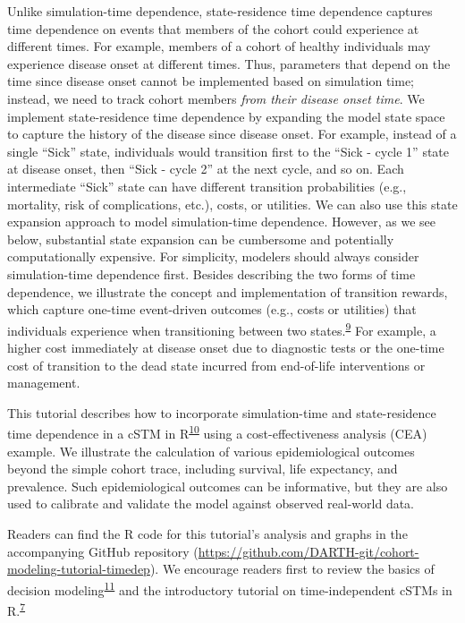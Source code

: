 \documentclass[
]{article}
\begin{document}
Unlike simulation-time dependence, state-residence time dependence captures time dependence on events that members of the cohort could experience at different times. For example, members of a cohort of healthy individuals may experience disease onset at different times. Thus, parameters that depend on the time since disease onset cannot be implemented based on simulation time; instead, we need to track cohort members \emph{from their disease onset time}. We implement state-residence time dependence by expanding the model state space to capture the history of the disease since disease onset. For example, instead of a single ``Sick'' state, individuals would transition first to the ``Sick - cycle 1'' state at disease onset, then ``Sick - cycle 2'' at the next cycle, and so on. Each intermediate ``Sick'' state can have different transition probabilities (e.g., mortality, risk of complications, etc.), costs, or utilities. We can also use this state expansion approach to model simulation-time dependence. However, as we see below, substantial state expansion can be cumbersome and potentially computationally expensive. For simplicity, modelers should always consider simulation-time dependence first. Besides describing the two forms of time dependence, we illustrate the concept and implementation of transition rewards, which capture one-time event-driven outcomes (e.g., costs or utilities) that individuals experience when transitioning between two states.\textsuperscript{\protect\hyperlink{ref-Krijkamp2019}{9}} For example, a higher cost immediately at disease onset due to diagnostic tests or the one-time cost of transition to the dead state incurred from end-of-life interventions or management.

This tutorial describes how to incorporate simulation-time and state-residence time dependence in a cSTM in R\textsuperscript{\protect\hyperlink{ref-Jalal2017b}{10}} using a cost-effectiveness analysis (CEA) example. We illustrate the calculation of various epidemiological outcomes beyond the simple cohort trace, including survival, life expectancy, and prevalence. Such epidemiological outcomes can be informative, but they are also used to calibrate and validate the model against observed real-world data.

Readers can find the R code for this tutorial's analysis and graphs in the accompanying GitHub repository (\url{https://github.com/DARTH-git/cohort-modeling-tutorial-timedep}). We encourage readers first to review the basics of decision modeling\textsuperscript{\protect\hyperlink{ref-Hunink2014}{11}} and the introductory tutorial on time-independent cSTMs in R.\textsuperscript{\protect\hyperlink{ref-Alarid-Escudero2022b}{7}}
\end{document}
